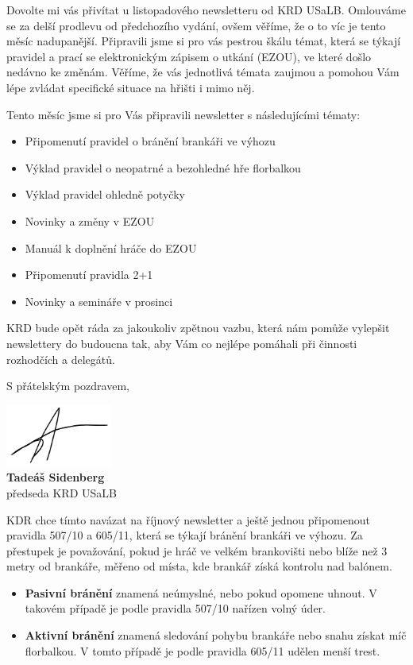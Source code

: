\documentclass{newsletter}
\begin{document}
Dovolte mi vás přivítat u listopadového newsletteru od KRD USaLB. Omlouváme se za delší prodlevu od předchozího vydání, ovšem věříme, že o to víc je tento měsíc nadupanější. Připravili jsme si pro vás pestrou škálu témat, která se týkají pravidel a prací se elektronickým zápisem o utkání (EZOU), ve které došlo nedávno ke změnám. Věříme, že vás jednotlivá témata zaujmou a pomohou Vám lépe zvládat specifické situace na hřišti i mimo něj.

Tento měsíc jsme si pro Vás připravili newsletter s následujícími tématy:
\begin{itemize}
	\item Připomenutí pravidel o bránění brankáři ve výhozu
	\item Výklad pravidel o neopatrné a bezohledné hře florbalkou
	\item Výklad pravidel ohledně potyčky
	\item Novinky a změny v EZOU
	\item Manuál k doplnění hráče do EZOU
	\item Připomenutí pravidla 2+1
	\item Novinky a semináře v prosinci
\end{itemize}

KRD bude opět ráda za jakoukoliv zpětnou vazbu, která nám pomůže vylepšit newslettery do budoucna tak, aby Vám co nejlépe pomáhali při činnosti rozhodčích a delegátů.

S přátelským pozdravem,

\begin{flushleft}
	\vspace{3\baselineskip}
	\includegraphics[width=3.5cm, keepaspectratio]{tadeas_sidenberg_podpis}\\
	\textbf{Tadeáš Sidenberg}\\
	předseda KRD USaLB
\end{flushleft}

\pagebreak
{}
KDR chce tímto navázat na říjnový newsletter a ještě jednou připomenout pravidla 507/10 a 605/11, která se týkají bránění brankáři ve výhozu. Za přestupek je považování, pokud je hráč ve velkém brankovišti nebo blíže než 3 metry od brankáře, měřeno od místa, kde brankář získá kontrolu nad balónem.
\begin{itemize}
	\item \textbf{Pasivní bránění} znamená neúmyslné, nebo pokud opomene uhnout. V takovém případě je podle pravidla 507/10 nařízen volný úder.
	\item \textbf{Aktivní bránění} znamená sledování pohybu brankáře nebo snahu získat míč florbalkou. V tomto případě je podle pravidla 605/11 udělen menší trest.
\end{itemize}
\end{document}
